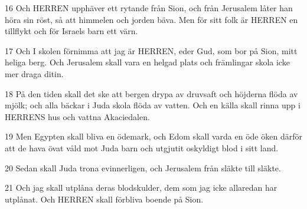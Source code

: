 \par 16 Och HERREN upphäver ett rytande från Sion, och från Jerusalem låter han höra sin röst, så att himmelen och jorden bäva. Men för sitt folk är HERREN en tillflykt och för Israels barn ett värn.
\par 17 Och I skolen förnimma att jag är HERREN, eder Gud, som bor på Sion, mitt heliga berg. Och Jerusalem skall vara en helgad plats och främlingar skola icke mer draga ditin.
\par 18 På den tiden skall det ske att bergen drypa av druvsaft och höjderna flöda av mjölk; och alla bäckar i Juda skola flöda av vatten. Och en källa skall rinna upp i HERRENS hus och vattna Akaciedalen.
\par 19 Men Egypten skall bliva en ödemark, och Edom skall varda en öde öken därför att de hava övat våld mot Juda barn och utgjutit oskyldigt blod i sitt land.
\par 20 Sedan skall Juda trona evinnerligen, och Jerusalem från släkte till släkte.
\par 21 Och jag skall utplåna deras blodskulder, dem som jag icke allaredan har utplånat. Och HERREN skall förbliva boende på Sion.



